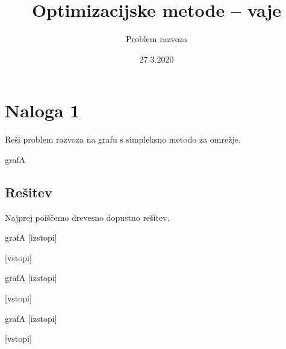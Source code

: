 \documentclass[14pt]{extarticle}
\title{Optimizacijske metode -- vaje}
\author{Problem razvoza}
\date{27.3.2020}
\begin{document}
\maketitle

\section*{Naloga 1}

Reši problem razvoza na grafu s simpleksno metodo za omrežje.

\begin{razvoz}{grafA}
\end{razvoz}

\subsection*{Rešitev}

Najprej poiščemo drevesno dopustno rešitev.

\begin{razvoz}{grafA}
    [izstopi]


    [vstopi]
\end{razvoz}

\begin{razvoz}{grafA}
    [izstopi]


    [vstopi]
\end{razvoz}

\begin{razvoz}{grafA}
    [izstopi]


    [vstopi]
\end{razvoz}
\end{document}

